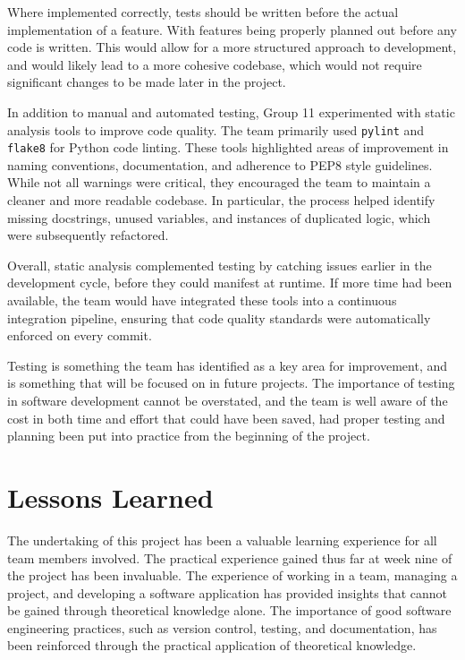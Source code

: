 \documentclass[conference]{IEEEtran}
\begin{document}
Where implemented correctly, tests should be written before the actual implementation of a feature. With features being properly planned out before any code is written. This would allow for a more structured approach to development, and would likely lead to a more cohesive codebase, which would not require significant changes to be made later in the project.

In addition to manual and automated testing, Group 11 experimented with static analysis tools to improve code quality. The team primarily used \texttt{pylint} and \texttt{flake8} for Python code linting. These tools highlighted areas of improvement in naming conventions, documentation, and adherence to PEP8 style guidelines. While not all warnings were critical, they encouraged the team to maintain a cleaner and more readable codebase. In particular, the process helped identify missing docstrings, unused variables, and instances of duplicated logic, which were subsequently refactored.

Overall, static analysis complemented testing by catching issues earlier in the development cycle, before they could manifest at runtime. If more time had been available, the team would have integrated these tools into a continuous integration pipeline, ensuring that code quality standards were automatically enforced on every commit.

Testing is something the team has identified as a key area for improvement, and is something that will be focused on in future projects. The importance of testing in software development cannot be overstated, and the team is well aware of the cost in both time and effort that could have been saved, had proper testing and planning been put into practice from the beginning of the project.

\section{Lessons Learned}
The undertaking of this project has been a valuable learning experience for all team members involved. The practical experience gained thus far at week nine of the project has been invaluable. The experience of working in a team, managing a project, and developing a software application has provided insights that cannot be gained through theoretical knowledge alone. The importance of good software engineering practices, such as version control, testing, and documentation, has been reinforced through the practical application of theoretical knowledge. 
\end{document}
